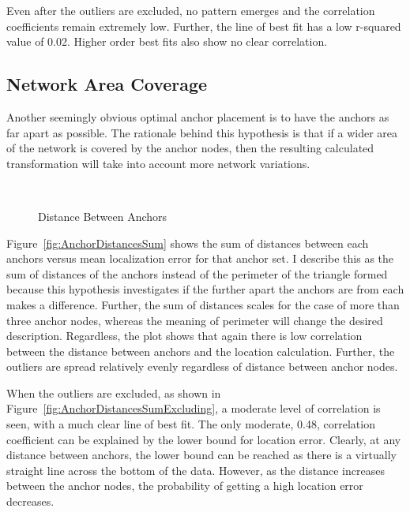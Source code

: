 Even after the outliers are excluded, no pattern emerges and the correlation coefficients remain extremely low.  Further, the line of best fit has a low r-squared value of 0.02.  Higher order best fits also show no clear correlation.

\subsection{Network Area Coverage}

Another seemingly obvious optimal anchor placement is to have the anchors as far apart as possible.  The rationale behind this hypothesis is that if a wider area of the network is covered by the anchor nodes, then the resulting calculated transformation will take into account more network variations.  

\begin{figure}
  \centering
		\\
	\caption{Distance Between Anchors}
    \label{fig:AnchorDistances}
\end{figure}

Figure~\ref{fig:AnchorDistancesSum} shows the sum of distances between each anchors versus mean localization error for that anchor set. I describe this as the sum of distances of the anchors instead of the perimeter of the triangle formed because this hypothesis investigates if the further apart the anchors are from each makes a difference. Further, the sum of distances scales for the case of more than three anchor nodes, whereas the meaning of perimeter will change the desired description. Regardless, the plot shows that again there is low correlation between the distance between anchors and the location calculation.  Further, the outliers are spread relatively evenly regardless of distance between anchor nodes.

When the outliers are excluded, as shown in Figure~\ref{fig:AnchorDistancesSumExcluding}, a moderate level of correlation is seen, with a much clear line of best fit.  The only moderate, 0.48, correlation coefficient can be explained by the lower bound for location error.  Clearly, at any distance between anchors, the lower bound can be reached as there is a virtually straight line across the bottom of the data.  However, as the distance increases between the anchor nodes, the probability of getting a high location error decreases.  

